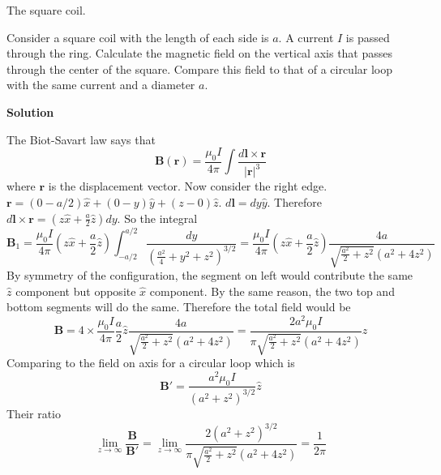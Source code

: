 \documentclass{article}
\begin{document}
\begin{homeworkProblem}
	The square coil.

	Consider a square coil with the length of each side is $a$. A current $I$ is passed through the ring. Calculate the magnetic field on the vertical axis that passes through the center of the square. Compare this field to that of a circular loop with the same current and a diameter $a$.

	\textbf{Solution}

	\begin{figure}[H]
		\centering
	\end{figure}

	The Biot-Savart law says that
	\[
		\mathbf{B}(\mathbf{r})=\frac{\mu_0I}{4\pi}\int\frac{d\mathbf{l}\times\mathbf{r}}{|\mathbf{r}|^3}
	\]
	where $\mathbf{r}$ is the displacement vector. Now consider the right edge. $\mathbf{r}=(0-a/2)\hat{x}+(0-y)\hat{y}+(z-0)\hat{z}$. $d\mathbf{l}=dy\hat{y}$. Therefore $d\mathbf{l}\times\mathbf{r}=\left(z\hat{x}+\frac{a}{2}\hat{z}\right)dy$. So the integral
	\[
		\mathbf{B}_1=\frac{\mu_0I}{4\pi}\left(z\hat{x}+\frac{a}{2}\hat{z}\right)\int_{-a/2}^{a/2}\frac{dy}{(\frac{a^2}{4}+y^2+z^2)^{3/2}}=\frac{\mu_0I}{4\pi}\left(z\hat{x}+\frac{a}{2}\hat{z}\right)\frac{4a}{\sqrt{\frac{a^2}{2}+z^2}\left(a^2+4z^2\right)}
	\]
	By symmetry of the configuration, the segment on left would contribute the same $\hat{z}$ component but opposite $\hat{x}$ component. By the same reason, the two top and bottom segments will do the same. Therefore the total field would be
	\[
		\mathbf{B}=4\times\frac{\mu_0I}{4\pi}\frac{a}{2}\hat{z}\frac{4a}{\sqrt{\frac{a^2}{2}+z^2}\left(a^2+4z^2\right)}=\frac{2a^2\mu_0I}{\pi\sqrt{\frac{a^2}{2}+z^2}\left(a^2+4z^2\right)}\hat{z}
	\]
	Comparing to the field on axis for a circular loop which is
	\[
		\mathbf{B}'=\frac{a^2\mu_0I}{\left(a^2+z^2\right)^{3/2}}\hat{z}
	\]
	Their ratio
	\[
		\lim_{z\rightarrow\infty}\frac{\mathbf{B}}{\mathbf{B}'}=\lim_{z\rightarrow\infty}\frac{2\left(a^2+z^2\right)^{3/2}}{\pi\sqrt{\frac{a^2}{2}+z^2}\left(a^2+4z^2\right)}=\frac{1}{2\pi}
	\]
\end{homeworkProblem}
\end{document}
